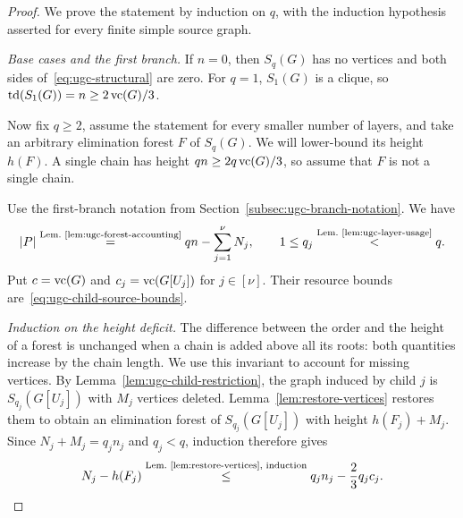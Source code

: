 \begin{proof}
We prove the statement by induction on $q$, with the induction
hypothesis asserted for every finite simple source graph.

\emph{Base cases and the first branch.}
If $n=0$, then $S_q(G)$ has no vertices and
both sides of~\eqref{eq:ugc-structural} are zero. For $q=1$,
$S_1(G)$ is a clique, so $\operatorname{td}(S_1(G))=n\geq2\operatorname{vc}(G)/3$.

Now fix $q\geq2$, assume the statement for every smaller number of
layers, and take an arbitrary elimination forest $F$ of $S_q(G)$. We
will lower-bound its height $h(F)$. A single chain has height
$qn\geq2q\operatorname{vc}(G)/3$, so assume that $F$ is not a
single chain.

Use the first-branch notation from
Section~\ref{subsec:ugc-branch-notation}. We have
\[
 |P|\overset{\text{Lem.~\ref{lem:ugc-forest-accounting}}}{=}
 qn-\sum_{j=1}^{\nu} N_j,
 \qquad
 1\leq q_j\overset{\text{Lem.~\ref{lem:ugc-layer-usage}}}{<}q.
\]
Put $c=\operatorname{vc}(G)$ and $c_j=\operatorname{vc}(G[U_j])$ for $j\in[\nu]$.
Their resource bounds are~\eqref{eq:ugc-child-source-bounds}.

\emph{Induction on the height deficit.}
The difference between the order and the height of a forest is unchanged
when a chain is added above all its roots: both quantities increase by
the chain length. We use this invariant to account for missing vertices.
By Lemma~\ref{lem:ugc-child-restriction}, the graph induced by
child $j$ is $S_{q_j}(G[U_j])$ with $M_j$ vertices deleted.
Lemma~\ref{lem:restore-vertices} restores them to obtain an
elimination forest of $S_{q_j}(G[U_j])$ with height $h(F_j)+M_j$.
Since $N_j+M_j=q_jn_j$ and $q_j<q$, induction therefore gives
\begin{equation}\label{eq:ugc-child-height-bound}
  N_j-h(F_j)
  \overset{\text{Lem.~\ref{lem:restore-vertices}, induction}}{\leq}
  q_jn_j-\frac{2}{3}q_jc_j.
\end{equation}


\end{proof}
